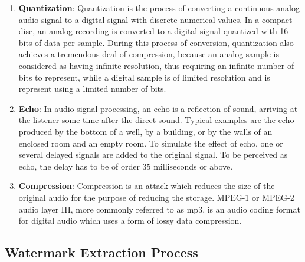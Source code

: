 \documentclass[12pt,a4paper]{report}
\begin{document}
\begin{enumerate}
\item \textbf{Quantization}: Quantization is the process of converting a continuous analog audio signal to a digital signal with discrete numerical values. In a compact disc, an analog recording is converted to a digital signal quantized with 16 bits of data per sample. During this process of conversion, quantization also achieves a tremendous deal of compression, because an analog sample is considered as having infinite resolution, thus requiring an infinite number of bits to represent, while a digital sample is of limited resolution and is represent using a limited number of bits. %

\item \textbf{Echo}: In audio signal processing, an echo is a reflection of sound, arriving at the listener some time after the direct sound. Typical examples are the echo produced by the bottom of a well, by a building, or by the walls of an enclosed room and an empty room. To simulate the effect of echo, one or several delayed signals are added to the original signal. To be perceived as echo, the delay has to be of order 35 milliseconds or above. %

\item \textbf{Compression}: Compression is an attack which reduces the size of the original audio for the purpose of reducing the storage. MPEG-1 or MPEG-2 audio layer III, more commonly referred to as mp3, is an audio coding format for digital audio which uses a form of lossy data compression. %


\end{enumerate}


\subsection{Watermark Extraction Process}
\end{document}
